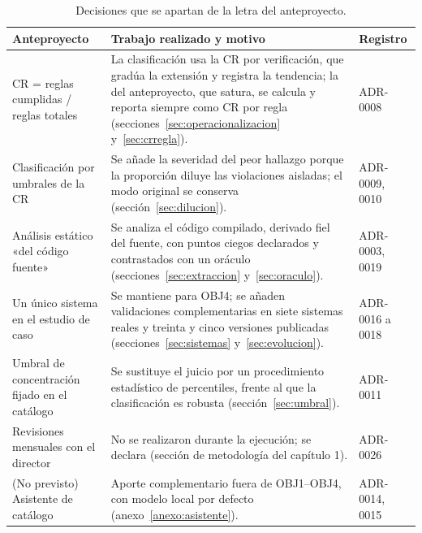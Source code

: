\begin{table}[H]
\centering
\caption{Decisiones que se apartan de la letra del anteproyecto.}
\label{tab:desviaciones}
\footnotesize
\begin{tabularx}{\textwidth}{p{3.6cm}Xp{1.9cm}}
\toprule
\textbf{Anteproyecto} & \textbf{Trabajo realizado y motivo} & \textbf{Registro} \\
\midrule
CR = reglas cumplidas / reglas totales &
La clasificación usa la CR por verificación, que gradúa la extensión y registra la tendencia; la del anteproyecto, que satura, se calcula y reporta siempre como CR por regla (secciones~\ref{sec:operacionalizacion} y~\ref{sec:crregla}). &
ADR-0008 \\
\midrule
Clasificación por umbrales de la CR &
Se añade la severidad del peor hallazgo porque la proporción diluye las violaciones aisladas; el modo original se conserva (sección~\ref{sec:dilucion}). &
ADR-0009, 0010 \\
\midrule
Análisis estático «del código fuente» &
Se analiza el código compilado, derivado fiel del fuente, con puntos ciegos declarados y contrastados con un oráculo (secciones~\ref{sec:extraccion} y~\ref{sec:oraculo}). &
ADR-0003, 0019 \\
\midrule
Un único sistema en el estudio de caso &
Se mantiene para OBJ4; se añaden validaciones complementarias en siete sistemas reales y treinta y cinco versiones publicadas (secciones~\ref{sec:sistemas} y~\ref{sec:evolucion}). &
ADR-0016 a 0018 \\
\midrule
Umbral de concentración fijado en el catálogo &
Se sustituye el juicio por un procedimiento estadístico de percentiles, frente al que la clasificación es robusta (sección~\ref{sec:umbral}). &
ADR-0011 \\
\midrule
Revisiones mensuales con el director &
No se realizaron durante la ejecución; se declara (sección de metodología del capítulo 1). &
ADR-0026 \\
\midrule
(No previsto) Asistente de catálogo &
Aporte complementario fuera de OBJ1--OBJ4, con modelo local por defecto (anexo~\ref{anexo:asistente}). &
ADR-0014, 0015 \\
\bottomrule
\end{tabularx}
\end{table}

